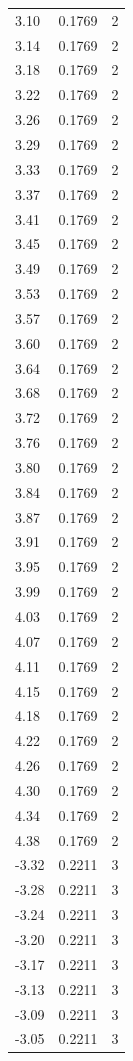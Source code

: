 \begin{longtable}{lrr}
  3.10 & 0.1769 & 2 \\
  3.14 & 0.1769 & 2 \\
  3.18 & 0.1769 & 2 \\
  3.22 & 0.1769 & 2 \\
  3.26 & 0.1769 & 2 \\
  3.29 & 0.1769 & 2 \\
  3.33 & 0.1769 & 2 \\
  3.37 & 0.1769 & 2 \\
  3.41 & 0.1769 & 2 \\
  3.45 & 0.1769 & 2 \\
  3.49 & 0.1769 & 2 \\
  3.53 & 0.1769 & 2 \\
  3.57 & 0.1769 & 2 \\
  3.60 & 0.1769 & 2 \\
  3.64 & 0.1769 & 2 \\
  3.68 & 0.1769 & 2 \\
  3.72 & 0.1769 & 2 \\
  3.76 & 0.1769 & 2 \\
  3.80 & 0.1769 & 2 \\
  3.84 & 0.1769 & 2 \\
  3.87 & 0.1769 & 2 \\
  3.91 & 0.1769 & 2 \\
  3.95 & 0.1769 & 2 \\
  3.99 & 0.1769 & 2 \\
  4.03 & 0.1769 & 2 \\
  4.07 & 0.1769 & 2 \\
  4.11 & 0.1769 & 2 \\
  4.15 & 0.1769 & 2 \\
  4.18 & 0.1769 & 2 \\
  4.22 & 0.1769 & 2 \\
  4.26 & 0.1769 & 2 \\
  4.30 & 0.1769 & 2 \\
  4.34 & 0.1769 & 2 \\
  4.38 & 0.1769 & 2 \\
  -3.32 & 0.2211 & 3 \\
  -3.28 & 0.2211 & 3 \\
  -3.24 & 0.2211 & 3 \\
  -3.20 & 0.2211 & 3 \\
  -3.17 & 0.2211 & 3 \\
  -3.13 & 0.2211 & 3 \\
  -3.09 & 0.2211 & 3 \\
  -3.05 & 0.2211 & 3 \\

\end{longtable}
